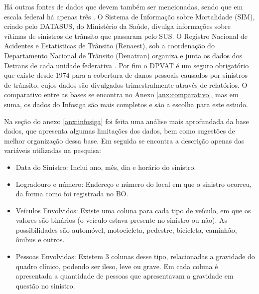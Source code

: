 Há outras fontes de dados que devem também ser mencionadas, sendo que em escala federal há apenas três \cite{magaly2011}. O Sistema de Informação sobre Mortalidade (SIM), criado pelo DATASUS, do Ministério da Saúde, divulga informações sobre vítimas de sinistros de trânsito que passaram pelo SUS. O Registro Nacional de Acidentes e Estatísticas de Trânsito (Renaest), sob a coordenação do Departamento Nacional de Trânsito (Denatran) organiza e junta os dados dos Detrans de cada unidade federativa \cite{nogueira2016morte}. Por fim o DPVAT é um seguro obrigatório que existe desde 1974 para a cobertura de danos pessoais causados por sinistros de trânsito, cujos dados são divulgados trimestralmente através de relatórios. O comparativo entre as bases se encontra no Anexo \ref{anx:comparativo}, mas em suma, os dados do Infosiga são mais completos e são a escolha para este estudo.

Na seção do anexo \ref{anx:infosiga} foi feita uma análise mais aprofundada da base dados, que apresenta algumas limitações dos dados, bem como sugestões de melhor organização dessa base. Em seguida se encontra a descrição apenas das variáveis utilizadas na pesquisa:

\begin{itemize}
    \item Data do Sinistro: Inclui ano, mês, dia e horário do sinistro.
    \item Logradouro e número: Endereço e número do local em que o sinistro ocorreu, da forma como foi registrada no BO.
    \item Veículos Envolvidos: Existe uma coluna para cada tipo de veículo, em que os valores são binários (o veículo estava presente no sinistro ou não). As possibilidades são automóvel, motocicleta, pedestre, bicicleta, caminhão, ônibus e outros.    
    \item Pessoas Envolvidas: Existem 3 colunas desse tipo, relacionadas a gravidade do quadro clínico, podendo ser ileso, leve ou grave. Em cada coluna é apresentada a quantidade de pessoas que apresentavam a gravidade em questão no sinistro.     
\end{itemize}

